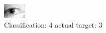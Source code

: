 \begin{figure}[h!]
\begin{center}
\includegraphics[width=0.60\columnwidth]{figures/ID1265_class_4_target_3.png}
\end{center}
\caption{ Classification: 4 actual target: 3}
\label{fig:ID1265_class_4_target_3}
\end{figure}
